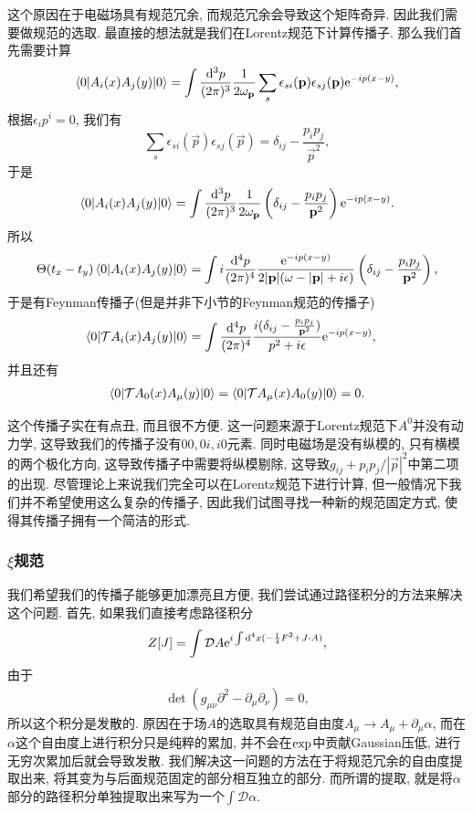 这个原因在于电磁场具有规范冗余, 而规范冗余会导致这个矩阵奇异. 因此我们需要做规范的选取. 最直接的想法就是我们在Lorentz规范下计算传播子. 那么我们首先需要计算
\begin{equation}
    \braket{0|A_i(x)A_j(y)|0}=\int\ld p\sum_s\epsilon_{si}(\vec p)\epsilon_{sj}(\vec p)\exp{-ip(x-y)}, 
\end{equation}
根据$\epsilon_i p^i=0$, 我们有
\begin{equation}
    \sum_s\epsilon_{si}(\vec p)\epsilon_{sj}(\vec p)=\delta_{ij}-\frac{p_ip_j}{\vec p^2}, 
\end{equation}
于是
\begin{equation}
    \braket{0|A_i(x)A_j(y)|0}=\int\ld p\left(\delta_{ij}-\frac{p_ip_j}{\vec p^2}\right)\exp{-ip(x-y)}.
\end{equation}
所以
\begin{equation}
    \Theta(t_x-t_y)\braket{0|A_i(x)A_j(y)|0}=\int i\dddd p\frac{\exp{-ip(x-y)}}{2|\vec p|(\omega-|\vec p|+i\epsilon)}\left(\delta_{ij}-\frac{p_ip_j}{\vec p^2}\right),
\end{equation}
于是有Feynman传播子(但是并非下小节的Feynman规范的传播子)
\begin{align}
    \braket{0|\mathcal TA_i(x)A_j(y)|0}&=\int\dddd p\frac{i(\delta_{ij}-\frac{p_ip_j}{\vec p^2})}{p^2+i\epsilon}\exp{-ip(x-y)},
\end{align}
并且还有
\begin{align}
    \braket{0|\mathcal TA_0(x)A_\mu(y)|0}=\braket{0|\mathcal TA_\mu(x)A_0(y)|0}=0.
\end{align}

这个传播子实在有点丑, 而且很不方便. 这一问题来源于Lorentz规范下$A^0$并没有动力学, 这导致我们的传播子没有$00, 0i, i0$元素. 同时电磁场是没有纵模的, 只有横模的两个极化方向, 这导致传播子中需要将纵模剔除, 这导致$g_{ij}+p_ip_j/|\vec p|^2$中第二项的出现. 尽管理论上来说我们完全可以在Lorentz规范下进行计算, 但一般情况下我们并不希望使用这么复杂的传播子, 因此我们试图寻找一种新的规范固定方式, 使得其传播子拥有一个简洁的形式.

\subsubsection{$\xi$规范}
我们希望我们的传播子能够更加漂亮且方便, 我们尝试通过路径积分的方法来解决这个问题. 首先, 如果我们直接考虑路径积分
\begin{align}
    Z[J]=\int\mathcal DA\exp{i\int\d^4x(-\frac14 F^2+J\cdot A)}, 
\end{align}
由于
\begin{align}
    \det(g_{\mu\nu}\partial^2-\partial_\mu\partial_\nu)=0, 
\end{align}
所以这个积分是发散的. 原因在于场$A$的选取具有规范自由度$A_\mu\to A_\mu+\partial_\mu\alpha$, 而在$\alpha$这个自由度上进行积分只是纯粹的累加, 并不会在$\rm{exp}$中贡献Gaussian压低, 进行无穷次累加后就会导致发散. 我们解决这一问题的方法在于将规范冗余的自由度提取出来, 将其变为与后面规范固定的部分相互独立的部分. 而所谓的提取, 就是将$\alpha$部分的路径积分单独提取出来写为一个$\int\mathcal D\alpha$.

